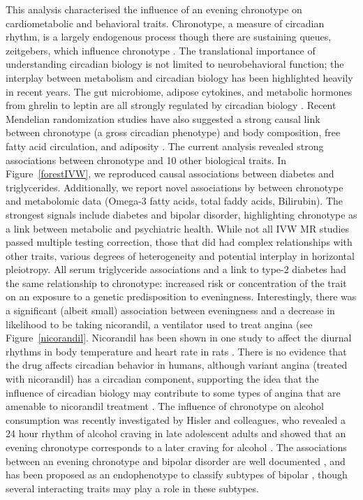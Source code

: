 \documentclass[journal,article,submit,moreauthors,pdftex]{Definitions/mdpi}
\begin{document}
This analysis characterised the influence of an evening chronotype on cardiometabolic and behavioral traits. Chronotype, a measure of circadian rhythm, is a largely endogenous process though there are sustaining queues, zeitgebers, which influence chronotype \cite{albrecht_timing_2012}. The translational importance of understanding circadian biology is not limited to neurobehavioral function; the interplay between metabolism and circadian biology has been highlighted heavily in recent years. The gut microbiome, adipose cytokines, and metabolic hormones from ghrelin to leptin are all strongly regulated by circadian biology \cite{li_circadian_2020,socaciu_melatonin_2020,pan_circadian_2020}. Recent Mendelian randomization studies have also suggested a strong causal link between chronotype (a gross circadian phenotype) and body composition, free fatty acid circulation, and adiposity \cite{adams_evaluating_2019,jones_genome-wide_2019}. The current analysis revealed strong associations between chronotype and 10 other biological traits. In Figure~\ref{forestIVW}, we reproduced causal associations between diabetes and triglycerides. Additionally, we report novel associations by between chronotype and metabolomic data (Omega-3 fatty acids, total faddy acids, Bilirubin). The strongest signals include diabetes and bipolar disorder, highlighting chronotype as a link between metabolic and psychiatric health. While not all IVW MR studies passed multiple testing correction, those that did had complex relationships with other traits, various degrees of heterogeneity and potential interplay in horizontal pleiotropy.
All serum triglyceride associations and a link to type-2 diabetes had the same relationship to chronotype: increased risk or concentration of the trait on an exposure to a genetic predisposition to eveningness. Interestingly, there was a significant (albeit small) association between eveningness and a decrease in likelihood to be taking nicorandil, a ventilator used to treat angina (see Figure~\ref{nicorandil}. Nicorandil has been shown in one study to affect the diurnal rhythms in body temperature and heart rate in rats \cite{gantenbein_nicorandil_1998}. There is no evidence that the drug affects circadian behavior in humans, although variant angina (treated with nicorandil) has a circadian component, supporting the idea that the influence of circadian biology may contribute to some types of angina that are amenable to nicorandil treatment \cite{kusama_variant_2011}. The influence of chronotype on alcohol consumption was recently investigated by Hisler and colleagues, who revealed a 24 hour rhythm of alcohol craving in late adolescent adults and showed that an evening chronotype corresponds to a later craving for alcohol \cite{hisler_is_2021}. The associations between an evening chronotype and bipolar disorder are well documented \cite{ferrer_clock_2020}, and has been proposed as an endophenotype to classify subtypes of bipolar \cite{romo-nava_evening_2020}, though several interacting traits may play a role in these subtypes.
\end{document}
